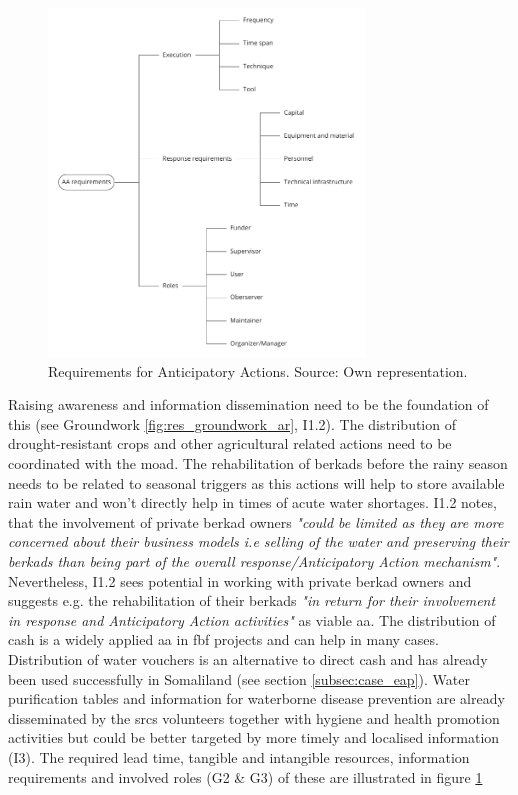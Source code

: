\begin{figure}[!hb]
    \centering
    \includegraphics[width=0.75\textwidth]{figures/2023_MA_results_AA.pdf}
    \decoRule
    \caption[Requirements for Anticipatory Actions]{Requirements for Anticipatory Actions. Source: Own representation.}
    \label{fig:res_aa}
\end{figure}

Raising awareness and information dissemination need to be the foundation of this (see Groundwork \ref{fig:res_groundwork_ar}, I1.2). The distribution of drought-resistant crops and other agricultural related actions need to be coordinated with the \acrfull{moad}. The rehabilitation of berkads before the rainy season needs to be related to seasonal triggers as this actions will help to store available rain water and won't directly help in times of acute water shortages. I1.2 notes, that the involvement of private berkad owners \textit{"could be limited as they are more concerned about their business models i.e selling of the water and preserving their berkads than being part of the overall response/Anticipatory Action mechanism"}. Nevertheless, I1.2 sees potential in working with private berkad owners and suggests e.g. the rehabilitation of their berkads \textit{"in return for their involvement in response and Anticipatory Action activities"} as viable \acrshort{aa}. The distribution of cash is a widely applied \acrshort{aa} in \acrshort{fbf} projects and can help in many cases. Distribution of water vouchers is an alternative to direct cash and has already been used successfully in Somaliland (see section \ref{subsec:case_eap}). Water purification tables and information for waterborne disease prevention are already disseminated by the \acrshort{srcs} volunteers together with hygiene and health promotion activities but could be better targeted by more timely and localised information (I3). The required lead time, tangible and intangible resources, information requirements and involved roles (G2 \& G3) of these  are illustrated in figure \ref{fig:res_aa}

